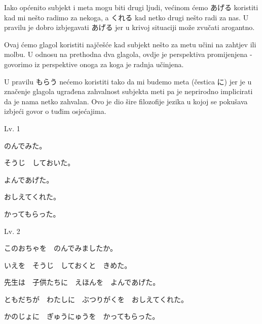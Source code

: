 	Iako općenito subjekt i meta mogu biti drugi ljudi, većinom ćemo あげる koristiti kad mi nešto radimo za nekoga, a くれる kad netko drugi nešto radi za nas. U pravilu je dobro izbjegavati あげる jer u krivoj situaciji može zvučati arogantno.
	
	
	Ovaj ćemo glagol koristiti najčešće kad subjekt nešto za metu učini na zahtjev ili molbu. U odnosu na prethodna dva glagola, ovdje je perspektiva promijenjena - govorimo iz perspektive onoga za koga je radnja učinjena.
	
	\begin{reibun}
	\end{reibun}

	U pravilu もらう nećemo koristiti tako da mi budemo meta (čestica に) jer je u značenje glagola ugrađena zahvalnost subjekta meti pa je neprirodno implicirati da je nama netko zahvalan. Ovo je dio šire filozofije jezika u kojoj se pokušava izbjeći govor o tuđim osjećajima.
	
	
	\begin{mondai}{Lv. 1}
		\item のんでみた。
		\item そうじ　しておいた。
		\item よんであげた。
		\item おしえてくれた。
		\item かってもらった。
	\end{mondai}

	\begin{mondai}{Lv. 2}
		\item このおちゃを　のんでみましたか。
		\item いえを　そうじ　しておくと　きめた。
		\item 先生は　子供たちに　えほんを　よんであげた。
		\item ともだちが　わたしに　ぶつりがくを　おしえてくれた。
		\item かのじょに　ぎゅうにゅうを　かってもらった。
	\end{mondai}

